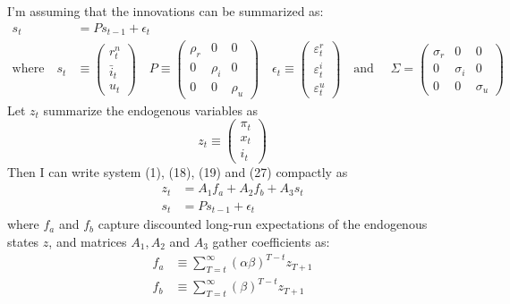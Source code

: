 \documentclass[11pt]{article}
\renewcommand{\[}{\begin{equation}}
\renewcommand{\]}{\end{equation}}
\begin{document}
 I'm assuming that the innovations can be summarized as:
 \begin{align}
 s_t & = P s_{t-1} + \epsilon_t \\
 \text{where} \quad 
 s_t & \equiv \begin{pmatrix} r_t^n \\ \bar{i}_t \\ u_t 
 \end{pmatrix} \quad 
 P  \equiv \begin{pmatrix} \rho_r & 0 & 0 \\ 0& \rho_i & 0 \\ 0&0& \rho_u 
 \end{pmatrix}  \quad 
 \epsilon_t \equiv \begin{pmatrix}\varepsilon_t^{r} \\ \varepsilon_t^{i}  \\ \varepsilon_t^{u} 
 \end{pmatrix}  \quad  \text{and } \quad \Sigma  =  \begin{pmatrix} \sigma_r & 0 & 0 \\ 0& \sigma_i & 0 \\ 0&0& \sigma_u 
 \end{pmatrix} 
 \end{align}
 Let $z_t$ summarize the endogenous variables as
 \begin{equation}
 z_t \equiv \begin{pmatrix} \pi_t \\ x_t \\ i_t
 \end{pmatrix}
 \end{equation}
 Then I can write system (1), (18), (19) and (27) compactly as
 \begin{align}
z_t & = A_1 f_a + A_2 f_b + A_3 s_t \label{RF} \\
s_t & = P s_{t-1} + \epsilon_t \label{exog}
\end{align}
 where $f_a$ and $f_b$ capture discounted long-run expectations of the endogenous states $z$, and matrices $A_1, A_2$ and $A_3$ gather coefficients as:
 \begin{align}
f_a & \equiv  \sum_{T=t}^{\infty} (\alpha\beta)^{T-t } z_{T+1}\\
f_b & \equiv \sum_{T=t}^{\infty} (\beta)^{T-t } z_{T+1}
\end{align}
\end{document}
